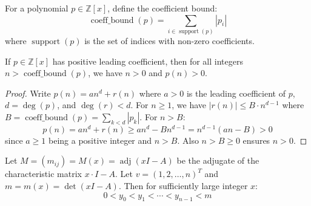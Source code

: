 \begin{definition}
\label{def:coeff_bound}
\leanok
For a polynomial $p \in \mathbb{Z}[x]$, define the coefficient bound:
$$\operatorname{coeff\_bound}(p) = \sum_{i \in \operatorname{support}(p)} |p_i|$$
where $\operatorname{support}(p)$ is the set of indices with non-zero coefficients.
\end{definition}

\begin{lemma}
\label{lem:polynomial_positive}
\leanok
If $p \in \mathbb{Z}[x]$ has positive leading coefficient, then for all integers $n > \operatorname{coeff\_bound}(p)$, we have $n > 0$ and $p(n) > 0$.
\end{lemma}

\begin{proof}
Write $p(n) = an^d + r(n)$ where $a > 0$ is the leading coefficient of $p$, $d = \deg(p)$, and $\deg(r) < d$.
For $n \geq 1$, we have $|r(n)| \leq B \cdot n^{d-1}$ where $B = \operatorname{coeff\_bound}(p) = \sum_{k < d} |p_k|$.
For $n > B$:
$$p(n) = an^d + r(n) \geq an^d - Bn^{d-1} = n^{d-1}(an - B) > 0$$
since $a \geq 1$ being a positive integer and $n > B$. Also $n > B \geq 0$ ensures $n > 0$.
\end{proof}

\begin{lemma}
\label{lem:adj_poly_strict_increasing}
Let $M = (m_{ij}) = M(x) = \operatorname{adj}(x I - A)$ be the adjugate of the characteristic matrix $x\cdot I - A$.
Let $v = (1,2,\ldots,n)^T$ and $m = m(x) = \det(x I - A)$. Then for sufficiently large integer $x$:
$$0 < y_0 < y_1 < \cdots < y_{n-1} < m$$
\end{lemma}

